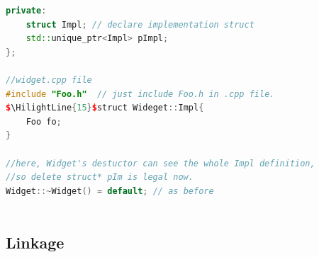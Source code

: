 \documentclass[a4paper,11pt,twoside]{book}
\newcommand{\HilightLine}[2][yellow]{\makebox[0pt][l]{\color{#1}\rule[-4pt]{#2em}{13.9pt}}}
\newcommand{\HilightLine}[2][yellow]{}
\begin{document}
\begin{itemize}
\begin{enumerate}
\begin{lstlisting}[frame=single, language=c++, mathescape=true]
private:
	struct Impl; // declare implementation struct
	std::unique_ptr<Impl> pImpl;
};
		
//widget.cpp file
#include "Foo.h"  // just include Foo.h in .cpp file.
$\HilightLine{15}$struct Wideget::Impl{
	Foo fo; 
}

//here, Widget's destuctor can see the whole Impl definition,
//so delete struct* pIm is legal now.
Widget::~Widget() = default; // as before
	
\end{lstlisting}
	\end{enumerate}
\end{itemize}

\subsection{Linkage}
\end{document}
